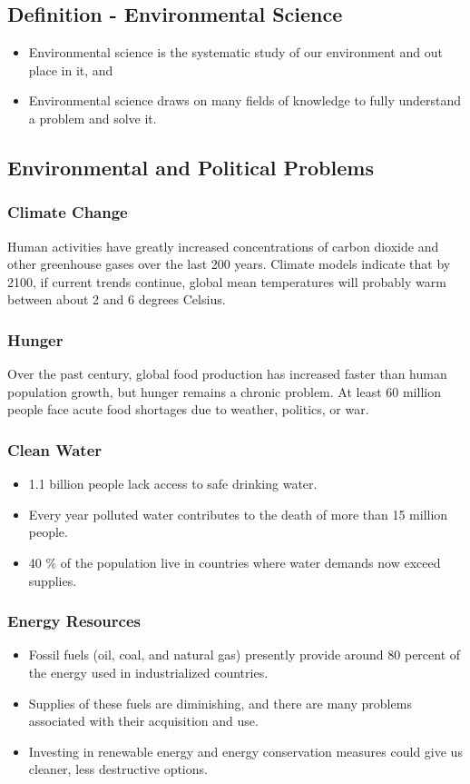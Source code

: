 \documentclass[10pt]{article}
\begin{document}
\subsection{Definition - Environmental Science}
\begin{itemize}
    \item Environmental science is the systematic study of our environment and out place in it, and
    \item Environmental science draws on many fields of knowledge to fully understand a problem and solve it. 
\end{itemize}

\subsection{Environmental and Political Problems}
\subsubsection{Climate Change} Human activities have greatly increased concentrations of carbon dioxide and other greenhouse gases over the last 200 years. Climate models indicate that by 2100, if current trends continue, global mean temperatures will probably warm between about 2 and 6 degrees Celsius. 

\subsubsection{Hunger} Over the past century, global food production has increased faster than human population growth, but hunger remains a chronic problem. At least 60 million people face acute food shortages due to weather, politics, or war. 

\subsubsection{Clean Water}
\begin{itemize}
    \item 1.1 billion people lack access to safe drinking water.
    \item Every year polluted water contributes to the death of more than 15 million people.
    \item 40 \% of the population live in countries where water demands now exceed supplies. 
\end{itemize}

\subsubsection{Energy Resources}
\begin{itemize}
    \item Fossil fuels (oil, coal, and natural gas) presently provide around 80 percent of the energy used in industrialized countries.
    \item Supplies of these fuels are diminishing, and there are many problems associated with their acquisition and use.
    \item Investing in renewable energy and energy conservation measures could give us cleaner, less destructive options.
\end{itemize}
\end{document}
